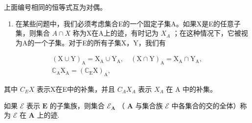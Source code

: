 上面编号相同的恒等式互为对偶。

\begin{enumerate}
\def\labelenumi{\arabic{enumi}.}
\setcounter{enumi}{15}
\tightlist
\item
  在某些问题中，我们必须考虑集合E的一个固定子集A。如果X是E的任意子集，则集合 \(A \cap X\) 称为X在A上的迹，有时记为 \(X_{A}\) ；在这种情况下，它被视为A的一个子集。对于E的所有子集X，Y，我们有
\end{enumerate}

\[
\begin{array}{c} (\mathrm{X} \cup \mathrm{Y}) _ {\mathrm{A}} = \mathrm{X} _ {\mathrm{A}} \cup \mathrm{Y} _ {\mathrm{A}}, \quad (\mathrm{X} \cap \mathrm{Y}) _ {\mathrm{A}} = \mathrm{X} _ {\mathrm{A}} \cap \mathrm{Y} _ {\mathrm{A}}, \\ \mathbb {C} _ {\mathrm{A}} \mathrm{X} _ {\mathrm{A}} = (\mathbb {C} _ {\mathrm{E}} \mathrm{X}) _ {\mathrm{A}}, \end{array}
\]

其中 \(C_{E}X\) 表示X在E中的补集，并且 \(C_{A}X_{A}\) 表示 \(X_{A}\) 在 A 中的补集。

如果 \(\mathcal{E}\) 表示 \(\mathbf{E}\) 的子集族，则集合 \(\mathcal{E}_{\mathbf{A}}\) （ \(\mathbf{A}\) 与集合族 \(\mathcal{E}\) 中各集合的交的全体）称为 \(\mathcal{E}\) 在 \(\mathbf{A}\) 上的迹.

